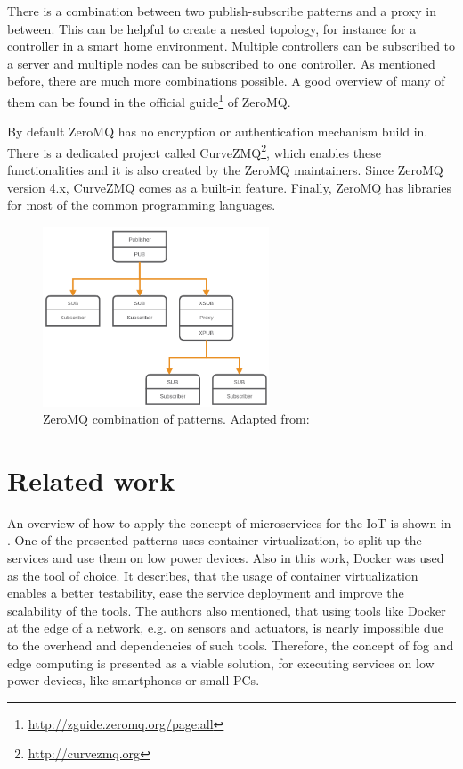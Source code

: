There is a combination between two publish-subscribe patterns and a proxy in between.
This can be helpful to create a nested topology, for instance for a controller in a smart home environment.
Multiple controllers can be subscribed to a server and multiple nodes can be subscribed to one controller.
As mentioned before, there are much more combinations possible.
A good overview of many of them can be found in the official guide\footnote{\url{http://zguide.zeromq.org/page:all}} of ZeroMQ.\newline

By default ZeroMQ has no encryption or authentication mechanism build in.
There is a dedicated project called CurveZMQ\footnote{\url{http://curvezmq.org}}, which enables these functionalities and it is also created by the ZeroMQ maintainers.
Since ZeroMQ version 4.x, CurveZMQ comes as a built-in feature.
Finally, ZeroMQ has libraries for most of the common programming languages.\newline

\begin{figure}[H]
    \centering
    \includegraphics[width=0.6\textwidth]{resources/images/zeromq-complex.png}
    \caption[ZeroMQ combination of patterns]{ZeroMQ combination of patterns. Adapted from: \autocite{ZeroMQ:Guide}}
    \label{fig:zeromq_comination}
\end{figure}


\section{Related work}
\label{section:related_work}
An overview of how to apply the concept of microservices for the \ac{IoT} is shown in \autocite{Butzin:2016}.
One of the presented patterns uses container virtualization, to split up the services and use them on low power devices.
Also in this work, Docker was used as the tool of choice.
It describes, that the usage of container virtualization enables a better testability, ease the service deployment and improve the scalability of the tools.\autocite[cf.][p. 5]{Butzin:2016}
The authors also mentioned, that using tools like Docker at the edge of a network, e.g. on sensors and actuators, is nearly impossible due to the overhead and dependencies of such tools.\autocite[cf.][p. 5]{Butzin:2016}
Therefore, the concept of fog and edge computing is presented as a viable solution, for executing services on low power devices, like smartphones or small \acp{PC}.\autocite[cf.][p. 5]{Butzin:2016}


